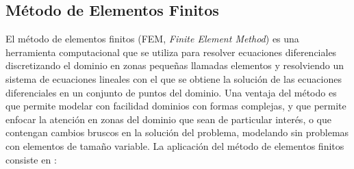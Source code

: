 \subsection*{Método de Elementos Finitos}

El método de elementos finitos (FEM, \textit{Finite Element Method}) es una herramienta computacional que se utiliza para resolver ecuaciones diferenciales discretizando el dominio en zonas pequeñas llamadas elementos y resolviendo un sistema de ecuaciones lineales con el que se obtiene la solución de las ecuaciones diferenciales en un conjunto de puntos del dominio. Una ventaja del método es que permite modelar con facilidad dominios con formas complejas, y que permite enfocar la atención en zonas del dominio que sean de particular interés, o que contengan cambios bruscos en la solución del problema, modelando sin problemas con elementos de tamaño variable. La aplicación del método de elementos finitos consiste en \cite{zien, gouri}:

